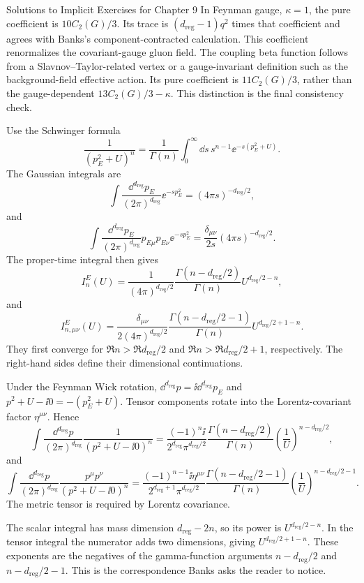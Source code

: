 \begin{bankssolutions}{Solutions to Implicit Exercises for Chapter 9}
In Feynman gauge, $\kappa=1$, the pure coefficient is $10C_2(G)/3$.
Its trace is $(d_{\mathrm{reg}}-1)q^2$ times that coefficient and agrees with Banks's
component-contracted calculation.  This coefficient renormalizes the
covariant-gauge gluon field.  The coupling beta function follows from a
Slavnov--Taylor-related vertex or a gauge-invariant definition such as the
background-field effective action.  Its pure coefficient is $11C_2(G)/3$,
rather than the gauge-dependent $13C_2(G)/3-\kappa$.  This distinction is the
final consistency check.

Use the Schwinger formula
\[
  \frac1{(p_E^2+U)^n}
  =\frac1{\Gamma(n)}\int_0^\infty\dd s\,
  s^{n-1}\ee^{-s(p_E^2+U)}.
\]
The Gaussian integrals are
\[
  \int\frac{\dd^{d_{\mathrm{reg}}}p_E}{(2\pi)^{d_{\mathrm{reg}}}}
  \ee^{-sp_E^2}=(4\pi s)^{-d_{\mathrm{reg}}/2},
\]
and
\[
  \int\frac{\dd^{d_{\mathrm{reg}}}p_E}{(2\pi)^{d_{\mathrm{reg}}}}
  p_{E\mu}p_{E\nu}\ee^{-sp_E^2}
  =\frac{\delta_{\mu\nu}}{2s}(4\pi s)^{-d_{\mathrm{reg}}/2}.
\]
The proper-time integral then gives
\[
  I_n^E(U)=\frac1{(4\pi)^{d_{\mathrm{reg}}/2}}
  \frac{\Gamma(n-d_{\mathrm{reg}}/2)}{\Gamma(n)}
  U^{d_{\mathrm{reg}}/2-n},
\]
and
\[
  I_{n,\mu\nu}^E(U)=
  \frac{\delta_{\mu\nu}}{2(4\pi)^{d_{\mathrm{reg}}/2}}
  \frac{\Gamma(n-d_{\mathrm{reg}}/2-1)}{\Gamma(n)}
  U^{d_{\mathrm{reg}}/2+1-n}.
\]
They first converge for $\Re n>\Re d_{\mathrm{reg}}/2$ and
$\Re n>\Re d_{\mathrm{reg}}/2+1$, respectively.  The right-hand sides define their
dimensional continuations.

Under the Feynman Wick rotation, $\dd^{d_{\mathrm{reg}}}p=\ii\dd^{d_{\mathrm{reg}}}p_E$ and
$p^2+U-\ii0=-(p_E^2+U)$.  Tensor components rotate into the Lorentz-covariant
factor $\eta^{\mu\nu}$.  Hence
\[
  \boxed{\displaystyle
  \int\frac{\dd^{d_{\mathrm{reg}}}p}{(2\pi)^{d_{\mathrm{reg}}}}
  \frac1{(p^2+U-\ii0)^n}
  =\frac{(-1)^n\ii}{2^{d_{\mathrm{reg}}}\pi^{d_{\mathrm{reg}}/2}}
  \frac{\Gamma(n-d_{\mathrm{reg}}/2)}{\Gamma(n)}
  \left(\frac1U\right)^{n-d_{\mathrm{reg}}/2}},
\]
and
\[
  \boxed{\displaystyle
  \int\frac{\dd^{d_{\mathrm{reg}}}p}{(2\pi)^{d_{\mathrm{reg}}}}
  \frac{p^\mu p^\nu}{(p^2+U-\ii0)^n}
  =\frac{(-1)^{n-1}\ii\eta^{\mu\nu}}
  {2^{d_{\mathrm{reg}}+1}\pi^{d_{\mathrm{reg}}/2}}
  \frac{\Gamma(n-d_{\mathrm{reg}}/2-1)}{\Gamma(n)}
  \left(\frac1U\right)^{n-d_{\mathrm{reg}}/2-1}}.
\]
The metric tensor is required by Lorentz covariance.

The scalar integral has mass dimension $d_{\mathrm{reg}}-2n$, so its power is
$U^{d_{\mathrm{reg}}/2-n}$.  In the tensor integral the numerator adds two
dimensions, giving $U^{d_{\mathrm{reg}}/2+1-n}$.  These exponents are the
negatives of the gamma-function arguments $n-d_{\mathrm{reg}}/2$ and
$n-d_{\mathrm{reg}}/2-1$.  This is the correspondence Banks asks the
reader to notice.


\end{bankssolutions}
